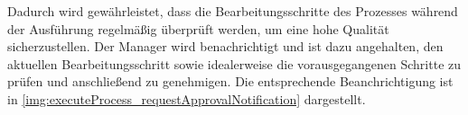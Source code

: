


\newpage
{}

Dadurch wird gewährleistet, dass die Bearbeitungsschritte des Prozesses während der Ausführung regelmäßig überprüft werden, um eine hohe Qualität sicherzustellen. Der Manager wird benachrichtigt und ist dazu angehalten, den aktuellen Bearbeitungsschritt sowie idealerweise die vorausgegangenen Schritte zu prüfen und anschließend zu genehmigen. Die entsprechende Beanchrichtigung ist in \autoref{img:executeProcess_requestApprovalNotification} dargestellt.

